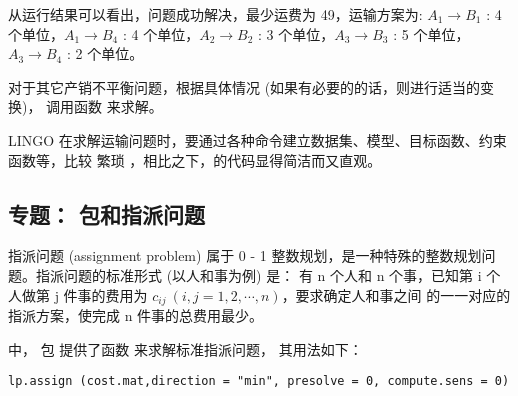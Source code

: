  从运行结果可以看出，问题成功解决，最少运费为 49，运输方案为:
  $A_1 \rightarrow 
 B_1$ : 4 个单位，$A_1\rightarrow
 B_4$ : 4 个单位，$A_2\rightarrow
 B_2$ : 3 个单位，$A_3\rightarrow
 B_3$ : 5 个单位，$A_3\rightarrow
 B_4$ : 2 个单位。


对于其它产销不平衡问题，根据具体情况 (如果有必要的的话，则进行适当的变换)，
调用函数  来求解。


LINGO 在求解运输问题时，要通过各种命令建立数据集、模型、目标函数、约束函数等，比较
繁琐%
，相比之下，\R 的代码显得简洁而又直观。
\subsection{专题：  包和指派问题}
 指派问题 (assignment problem) 属于 0 - 1 整数规划，是一种特殊的整数规划问题。指派问题的标准形式 (以人和事为例) 是：
 有 n 个人和 n 个事，已知第 i 个人做第 j 件事的费用为 $c_{ij}\ (i,j=1,2,\cdots,n)$，要求确定人和事之间
 的一一对应的指派方案，使完成 n 件事的总费用最少。


 \R 中，  包
 提供了函数  来求解标准指派问题，
 其用法如下：

\begin{verbatim}
lp.assign (cost.mat,direction = "min", presolve = 0, compute.sens = 0)
\end{verbatim}

